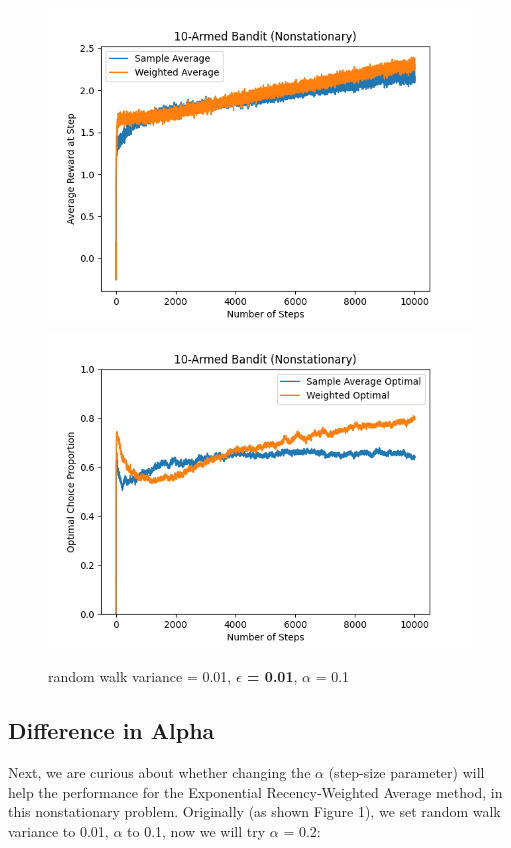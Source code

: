 \documentclass{article}
\begin{document}
\begin{figure}[h!]
\centering
\includegraphics[scale=.6]{RL_A1_pics/epsilon/0.01.png}
\includegraphics[scale=.6]{RL_A1_pics/epsilon/optimal/0.01.png}
\caption{random walk variance = 0.01, \textbf{$\epsilon$ = 0.01}, $\alpha$ = 0.1}
\label{fig:10-Armed1}
\end{figure}


\subsection{Difference in Alpha}
Next, we are curious about whether changing the $\alpha$ (step-size parameter) will help the performance for the Exponential Recency-Weighted Average method, in this nonstationary problem. Originally (as shown Figure 1), we set random walk variance to 0.01, $\alpha$ to 0.1, now we will try $\alpha$ = 0.2: 
\end{document}
